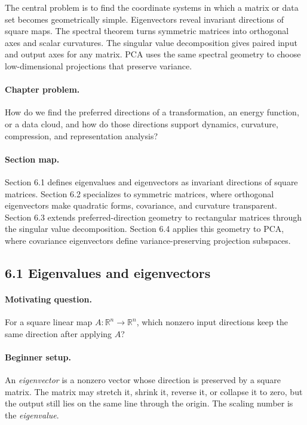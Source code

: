 The central problem is to find the coordinate systems in which a matrix or data set becomes geometrically simple. Eigenvectors reveal invariant directions of square maps. The spectral theorem turns symmetric matrices into orthogonal axes and scalar curvatures. The singular value decomposition gives paired input and output axes for any matrix. PCA uses the same spectral geometry to choose low-dimensional projections that preserve variance.

\paragraph{Chapter problem.}
How do we find the preferred directions of a transformation, an energy function, or a data cloud, and how do those directions support dynamics, curvature, compression, and representation analysis?

\paragraph{Section map.}
Section 6.1 defines eigenvalues and eigenvectors as invariant directions of square matrices. Section 6.2 specializes to symmetric matrices, where orthogonal eigenvectors make quadratic forms, covariance, and curvature transparent. Section 6.3 extends preferred-direction geometry to rectangular matrices through the singular value decomposition. Section 6.4 applies this geometry to PCA, where covariance eigenvectors define variance-preserving projection subspaces.

\subsection{6.1 Eigenvalues and eigenvectors}

\paragraph{Motivating question.}
For a square linear map \(A:\mathbb{R}^n\to\mathbb{R}^n\), which nonzero input directions keep the same direction after applying \(A\)?

\paragraph{Beginner setup.}
An \emph{eigenvector} is a nonzero vector whose direction is preserved by a square matrix. The matrix may stretch it, shrink it, reverse it, or collapse it to zero, but the output still lies on the same line through the origin. The scaling number is the \emph{eigenvalue}.

